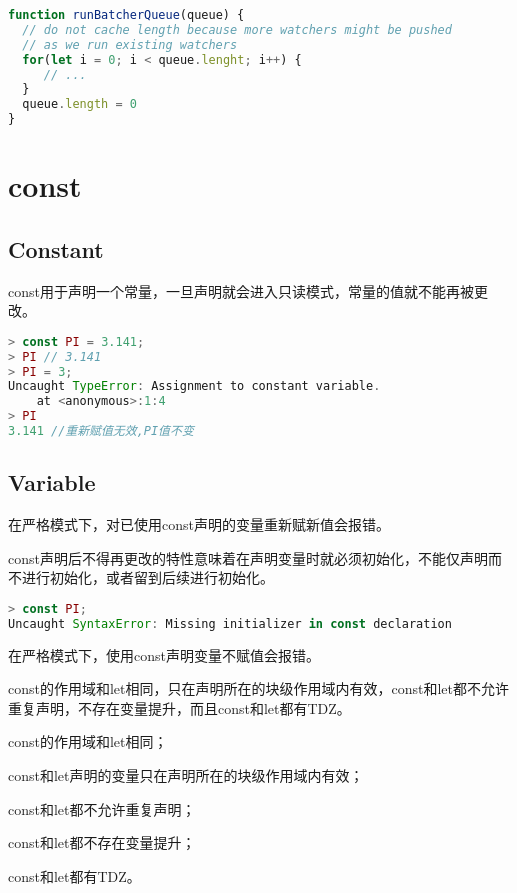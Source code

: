\begin{lstlisting}[language=JavaScript]
function runBatcherQueue(queue) {
  // do not cache length because more watchers might be pushed
  // as we run existing watchers
  for(let i = 0; i < queue.lenght; i++) {
     // ...
  }
  queue.length = 0
}
\end{lstlisting}


\section{const}


\subsection{Constant}



const用于声明一个常量，一旦声明就会进入只读模式，常量的值就不能再被更改。


\begin{lstlisting}[language=JavaScript]
> const PI = 3.141;
> PI // 3.141
> PI = 3; 
Uncaught TypeError: Assignment to constant variable.
    at <anonymous>:1:4
> PI
3.141 //重新赋值无效,PI值不变
\end{lstlisting}


\subsection{Variable}


在严格模式下，对已使用const声明的变量重新赋新值会报错。

const声明后不得再更改的特性意味着在声明变量时就必须初始化，不能仅声明而不进行初始化，或者留到后续进行初始化。





\begin{lstlisting}[language=JavaScript]
> const PI;
Uncaught SyntaxError: Missing initializer in const declaration
\end{lstlisting}

在严格模式下，使用const声明变量不赋值会报错。

const的作用域和let相同，只在声明所在的块级作用域内有效，const和let都不允许重复声明，不存在变量提升，而且const和let都有TDZ。

\begin{compactitem}
\item const的作用域和let相同；
\item const和let声明的变量只在声明所在的块级作用域内有效；
\item const和let都不允许重复声明；
\item const和let都不存在变量提升；
\item const和let都有TDZ。
\end{compactitem}

